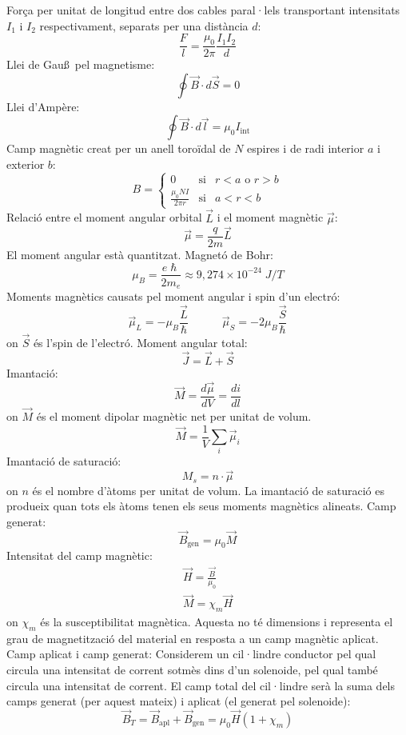 \documentclass[class=article,10pt,crop=false]{standalone}
\begin{document}
\begin{multicols}{2}
\begin{itemize}
\end{itemize}
Força per unitat de longitud entre dos cables paral·lels transportant intensitats $I_1$ i $I_2$ res\-pec\-ti\-va\-ment, separats per una distància $d$: $$\frac{F}{l}=\frac{\mu_0}{2\pi}\frac{I_1I_2}{d}$$
Llei de Gau\ss\ pel magnetisme: $$\oint\Vec{B}\cdot d\Vec{S}=0$$
Llei d'Ampère: $$\oint\Vec{B}\cdot d\Vec{l}=\mu_0I_{\text{int}}$$
Camp magnètic creat per un anell toroïdal de $N$ espires i de radi interior $a$ i exterior $b$: $$B=\left\{
    \begin{array}{ccc}
    0 & \text{si} & r<a\text{ o }r>b \\
    \displaystyle\frac{\mu_0NI}{2\pi r} & \text{si} & a<r<b
    \end{array}\right.$$
Relació entre el moment angular orbital $\Vec{L}$ i el moment magnètic $\Vec{\mu}$: $$\Vec{\mu}=\frac{q}{2m}\Vec{L}$$
El moment angular està quantitzat.\newline
Magnetó de Bohr: $$\mu_B=\frac{e\hslash}{2m_e}\approx9,274\times10^{-24}\;J/T$$
Moments magnètics causats pel moment angular i spin d'un electró:
$$\Vec{\mu}_L=-\mu_B\frac{\Vec{L}}{\hslash}\quad\qquad\Vec{\mu}_S=-2\mu_B\frac{\Vec{S}}{\hslash}$$ {on $\Vec{S}$ és l'spin de l'electró.}\newline
Moment angular total: $$\Vec{J}=\Vec{L}+\Vec{S}$$
Imantació: $$\Vec{M}=\frac{d\Vec{\mu}}{dV}=\frac{di}{dl}$$ {on $\Vec{M}$ és el moment dipolar magnètic net per unitat de volum.}
$$\Vec{M}=\frac{1}{V}\sum_i\Vec{\mu}_i$$
Imantació de saturació: $$M_s=n\cdot\Vec{\mu}$$ {on $n$ és el nombre d'àtoms per unitat de volum.}\newline
La imantació de saturació es produeix quan tots els àtoms tenen els seus moments magnètics alineats.\newline
Camp generat:
$$\Vec{B}_{\text{gen}}=\mu_0\Vec{M}$$
Intensitat del camp magnètic: \begin{gather*}
\Vec{H}=\frac{\Vec{B}}{\mu_0}\\
\Vec{M}=\chi_m\Vec{H}
\end{gather*}
{on $\chi_m$ és la susceptibilitat magnètica. Aquesta no té dimensions i representa el grau de magnetització del material en resposta a un camp magnètic aplicat.}\newline
Camp aplicat i camp generat: Considerem un cil·lindre conductor pel qual circula una intensitat de corrent sotmès dins d'un solenoide, pel qual també circula una intensitat de corrent. El camp total del cil·lindre serà la suma dels camps generat (per aquest mateix) i aplicat (el generat pel solenoide): $$\Vec{B}_T=\Vec{B}_{\text{apl}}+\Vec{B}_{\text{gen}}=\mu_0\Vec{H}(1+\chi_m)$$

\end{multicols}
\end{document}
